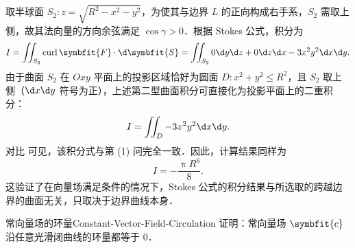 \begin{solution}

    取半球面 $S_2 \colon z = \sqrt{R^2-x^2-y^2}$，为使其与边界 $L$ 的正向构成右手系，$S_2$ 需取上侧，故其法向量的方向余弦满足 $\cos \gamma > 0$．根据 Stokes 公式，积分为
    \begin{equation}
        \label{eq:stokes-S2}
        I = \iint_{S_2} \operatorname{curl} \symbfit{F} \cdot \d \symbfit{S} = \iint_{S_2} 0 \d y \d z + 0 \d z \d x - 3x^2 y^2 \d x \d y.
    \end{equation}
    由于曲面 $S_2$ 在 $Oxy$ 平面上的投影区域恰好为圆面 $D \colon x^2+y^2 \leqslant R^2$，且 $S_2$ 取上侧（$\d x \d y$ 符号为正），上述第二型曲面积分可直接化为投影平面上的二重积分：
    \begin{equation}
        \label{eq:eval-S2}
        I = \iint_{D} -3x^2 y^2 \d x \d y.
    \end{equation}
    对比  可见，该积分式与第 (1) 问完全一致．因此，计算结果同样为
    \begin{equation}
        \label{eq:res-2-1}
        \boxed{I = -\frac{\uppi R^6}{8}}.
    \end{equation}
    这验证了在向量场满足条件的情况下，Stokes 公式的积分结果与所选取的跨越边界的曲面无关，只取决于边界曲线本身．
\end{solution}

\begin{problem}{常向量场的环量}{Constant-Vector-Field-Circulation}
    证明：常向量场 $\symbfit{c}$ 沿任意光滑闭曲线的环量都等于 $0$．
\end{problem}

